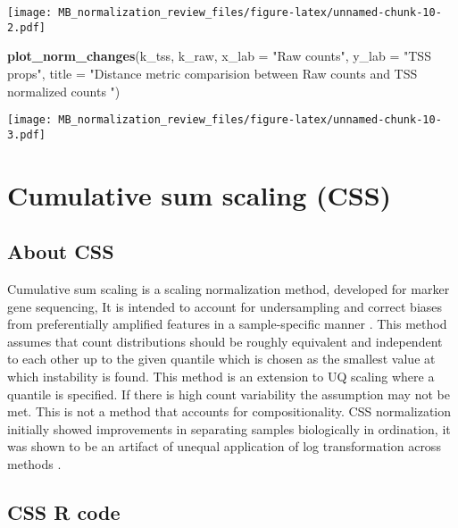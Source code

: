 \documentclass[
]{book}
\newenvironment{Shaded}{\begin{snugshade}}{\end{snugshade}}
\newcommand{\DataTypeTok}[1]{\textcolor[rgb]{0.13,0.29,0.53}{#1}}
\newcommand{\KeywordTok}[1]{\textcolor[rgb]{0.13,0.29,0.53}{\textbf{#1}}}
\newcommand{\NormalTok}[1]{#1}
\newcommand{\StringTok}[1]{\textcolor[rgb]{0.31,0.60,0.02}{#1}}
\begin{document}
\texttt{[image: MB\_normalization\_review\_files/figure-latex/unnamed-chunk-10-2.pdf]}

\begin{Shaded}
\begin{Highlighting}[]
\KeywordTok{plot\_norm\_changes}\NormalTok{(k\_tss, k\_raw,}
                  \DataTypeTok{x\_lab =} \StringTok{"Raw counts"}\NormalTok{, }\DataTypeTok{y\_lab =} \StringTok{"TSS props"}\NormalTok{, }
                  \DataTypeTok{title =} \StringTok{"Distance metric comparision between Raw counts and TSS normalized counts "}\NormalTok{)}
\end{Highlighting}
\end{Shaded}

\texttt{[image: MB\_normalization\_review\_files/figure-latex/unnamed-chunk-10-3.pdf]}

\hypertarget{cumulative-sum-scaling-css}{%
\section{Cumulative sum scaling (CSS)}\label{cumulative-sum-scaling-css}}

\hypertarget{about-css}{%
\subsection{About CSS}\label{about-css}}

Cumulative sum scaling is a scaling normalization method, developed for marker gene sequencing, It is intended to account for undersampling and correct biases from preferentially amplified features in a sample-specific manner \citep{paulson2013}. This method assumes that count distributions should be roughly equivalent and independent to each other up to the given quantile which is chosen as the smallest value at which instability is found. This method is an extension to UQ scaling where a quantile is specified. If there is high count variability the assumption may not be met. This is not a method that accounts for compositionality. CSS normalization initially showed improvements in separating samples biologically in ordination, it was shown to be an artifact of unequal application of log transformation across methods \citep{costea2014}.

\hypertarget{css-r-code}{%
\subsection{CSS R code}\label{css-r-code}}
\end{document}
